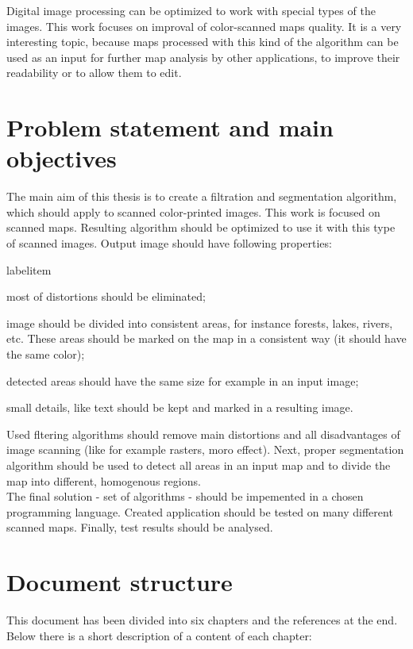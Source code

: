 \documentclass[a4paper,onecolumn,oneside,12pt]{memoir}
\makeatletter
\renewenvironment{itemize}{
  \begin{list}{  
  \csname labelitem\romannumeral\the\@listdepth\endcsname}{
  \setlength{\leftmargin}{1em}
	\setlength{\topsep}{6pt}%
	\setlength{\partopsep}{0pt}%
	\setlength{\parskip}{0pt}%
	\setlength{\parsep}{0pt}%
	\setlength{\itemsep}{0pt}}
}{
  \end{list}
}
\makeatother
\begin{document}
Digital image processing can be optimized to work with special types of the images. This work 
focuses on improval of color-scanned maps quality. It is a very interesting topic, because maps
processed with this kind of the algorithm can be used as an input for further map analysis by other 
applications, to improve their readability or to allow them to edit.

\section{Problem statement and main objectives}

The main aim of this thesis is to create a filtration and segmentation algorithm, which should apply
to scanned color-printed images. This work is focused on scanned maps. Resulting algorithm should be
optimized to use it with this type of scanned images. Output image should have following properties:

\begin{itemize}
  \item most of distortions should be eliminated;
  \item image should be divided into consistent areas, for instance forests, lakes, rivers, etc. These areas
        should be marked on the map in a consistent way (it should have the same color);
  \item detected areas should have the same size for example in an input image;
  \item small details, like text should be kept and marked in a resulting image.
\end{itemize}

Used fltering algorithms should remove main distortions and all disadvantages of image scanning (like
for example rasters, moro effect). Next, proper segmentation algorithm should be used to detect all
areas in an input map and to divide the map into different, homogenous regions. \\

The final solution - set of algorithms - should be impemented in a chosen programming language.
Created application should be tested on many different scanned maps. Finally, test results should be
analysed.

\section{Document structure}

This document has been divided into six chapters and the references at the end.
Below there is a short description of a content of each chapter:
\end{document}
